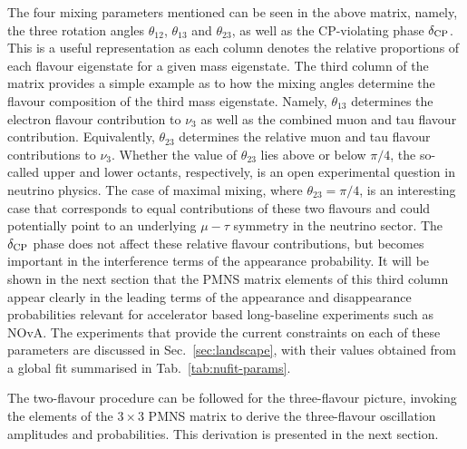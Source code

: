 The four mixing parameters mentioned can be seen in the above matrix, namely, the three rotation angles $\theta_{12}$, $\theta_{13}$ and $\theta_{23}$, as well as the CP-violating phase $\delta_{\rm CP}$. This is a useful representation as each column denotes the relative proportions of each flavour eigenstate for a given mass eigenstate. The third column of the matrix provides a simple example as to how the mixing angles determine the flavour composition of the third mass eigenstate. Namely, $\theta_{13}$ determines the electron flavour contribution to $\nu_3$ as well as the combined muon and tau flavour contribution. Equivalently, $\theta_{23}$ determines the relative muon and tau flavour contributions to $\nu_3$. Whether the value of $\theta_{23}$ lies above or below $\pi/4$, the so-called upper and lower octants, respectively, is an open experimental question in neutrino physics. The case of maximal mixing, where $\theta_{23} = \pi/4$, is an interesting case that corresponds to equal contributions of these two flavours and could potentially point to an underlying $\mu-\tau$ symmetry in the neutrino sector. The $\delta_{\rm CP}$ phase does not affect these relative flavour contributions, but
becomes important in the interference terms of the appearance probability. It will be shown in the next section that the PMNS matrix elements of this third column appear clearly in the leading terms of the appearance and disappearance probabilities relevant for accelerator based long-baseline experiments such as NOvA.
The experiments that provide the current constraints on each of these parameters are discussed in Sec.~\ref{sec:landscape}, with their values obtained from a global fit summarised in Tab.~\ref{tab:nufit-params}.

The two-flavour procedure can be followed for the three-flavour picture, invoking the elements of the $3\times3$ PMNS matrix to derive the three-flavour oscillation amplitudes and probabilities. This derivation is presented in the next section.

